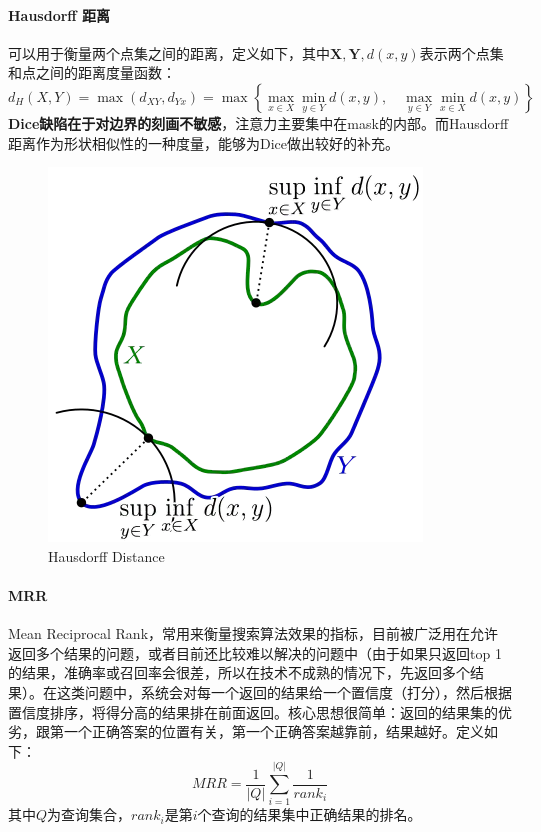 \paragraph{Hausdorff 距离} 可以用于衡量两个点集之间的距离，定义如下，其中$\boldsymbol{X}, \boldsymbol{Y}, d(x, y)$表示两个点集和点之间的距离度量函数：
$$
d_{H}(X, Y) = \max (d_{X Y}, d_{Y x}) = \max \left\{\underset{x \in X}{\max } \min _{y \in Y}d(x, y),\quad \max _{y \in Y} \min _{x \in X} d(x, y)\right\}
$$
\textbf{Dice缺陷在于对边界的刻画不敏感}，注意力主要集中在mask的内部。而Hausdorff距离作为形状相似性的一种度量，能够为Dice做出较好的补充。
\begin{figure}[h]
	\centering
	\includegraphics[width=.5\textwidth]{pics/Hausdorff distance.png}
	\caption{Hausdorff Distance}
	\label{fig: hausdorff distance}
\end{figure}

\paragraph{MRR}
Mean Reciprocal Rank，常用来衡量搜索算法效果的指标，目前被广泛用在允许返回多个结果的问题，或者目前还比较难以解决的问题中（由于如果只返回top 1的结果，准确率或召回率会很差，所以在技术不成熟的情况下，先返回多个结果）。在这类问题中，系统会对每一个返回的结果给一个置信度（打分），然后根据置信度排序，将得分高的结果排在前面返回。核心思想很简单：返回的结果集的优劣，跟第一个正确答案的位置有关，第一个正确答案越靠前，结果越好。定义如下：
$$
MRR = \frac{1}{|Q|} \sum_{i=1}^{|Q|} \frac{1}{rank_i}
$$
其中$Q$为查询集合，$rank_i$是第$i$个查询的结果集中正确结果的排名。

